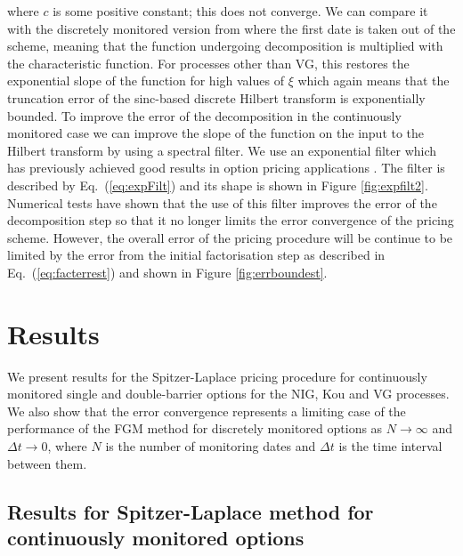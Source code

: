 \documentclass[11pt,a4paper]{article}
\begin{document}
where $c$ is some positive constant; this does not converge. We can compare it with the discretely monitored version from \cite{Fusai2016} where the first date is taken out of the scheme, meaning that the function undergoing decomposition is multiplied with the characteristic function. For processes other than VG, this restores the exponential slope of the function for high values of $\xi$ which again means that the truncation error of the sinc-based discrete Hilbert transform is exponentially bounded. To improve the error of the decomposition in the continuously monitored case we can improve the slope of the function on the input to the Hilbert transform by using a spectral filter. We use an exponential filter which has previously achieved good results in option pricing applications \citep{ruijter2015application,Phelan2017}. The filter is described by Eq.~(\ref{eq:expFilt}) and its shape is shown in Figure \ref{fig:expfilt2}. Numerical tests have shown that the use of this filter improves the error of the decomposition step so that it no longer limits the error convergence of the pricing scheme. However, the overall error of the pricing procedure will be continue to be limited by the error from the initial factorisation step as described in Eq.~(\ref{eq:facterrest}) and shown in Figure \ref{fig:errboundest}.
\FloatBarrier

\section{Results}\label{sec:Res}

We present results for the Spitzer-Laplace pricing procedure for continuously monitored single and double-barrier options for the NIG, Kou and VG processes. We also show that the error convergence represents a limiting case of the performance of the FGM method for discretely monitored options as $N\rightarrow\infty$ and $\Delta t\rightarrow0$, where $N$ is the number of monitoring dates and $\Delta t$ is the time interval between them.

\subsection{Results for Spitzer-Laplace method for continuously monitored options}\label{sec:Res_Cont}
\end{document}
